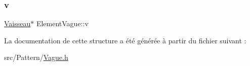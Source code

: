 \subsubsection{\texorpdfstring{v}{v}}
{\footnotesize\ttfamily \hyperlink{class_vaisseau}{Vaisseau}$\ast$ Element\+Vague\+::v}



La documentation de cette structure a été générée à partir du fichier suivant \+:\begin{DoxyCompactItemize}
\item 
src/\+Pattern/\hyperlink{_vague_8h}{Vague.\+h}\end{DoxyCompactItemize}
